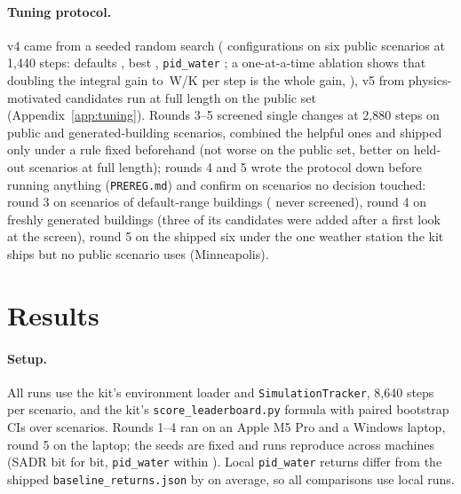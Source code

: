 \documentclass{article}
\begin{document}
\paragraph{Tuning protocol.}
v4 came from a seeded random search (\NTuneConfigs{} configurations on six public scenarios at 1,440 steps:
defaults \TuneDefaultScreen, best \TuneBestScreen, \texttt{pid\_water} \TunePidWaterScreen; a one-at-a-time
ablation shows that doubling the integral gain to \ParKiWPerKStep\,W/K per step is the whole gain,
\AblRelDefAddKi), v5 from \NCandV{} physics-motivated candidates run at full length on the public set
(Appendix~\ref{app:tuning}). Rounds 3--5 screened single changes at 2,880 steps on public and
generated-building scenarios, combined the helpful ones and shipped only under a rule fixed beforehand (not
worse on the public set, better on held-out scenarios at full length); rounds 4 and 5 wrote the protocol down
before running anything (\texttt{PREREG.md}) and confirm on scenarios no decision touched: round 3 on
\NHeldAll{} scenarios of \NHeldAllBuild{} default-range buildings (\NHeldUnscr{} never screened), round 4 on
\RFFreshNBuild{} freshly generated buildings (three of its candidates were added after a first look at the
screen), round 5 on the shipped six under the one
weather station the kit ships but no public scenario uses (Minneapolis).

\section{Results}
\label{sec:results}

\paragraph{Setup.}
All runs use the kit's environment loader and \texttt{SimulationTracker}, 8,640 steps per scenario,
and the kit's \texttt{score\_leaderboard.py} formula with paired bootstrap CIs over scenarios. Rounds 1--4
ran on an Apple M5 Pro and a Windows laptop, round 5 on the laptop; the seeds are fixed and runs reproduce
across machines (SADR bit for bit, \texttt{pid\_water} within \MachineGapPidWater). Local \texttt{pid\_water} returns differ
from the shipped \texttt{baseline\_returns.json} by \GapMeanPidWater{} on average, so all comparisons use
local runs.
\end{document}
